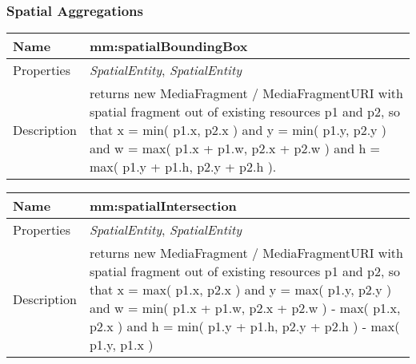 \subsubsection*{Spatial Aggregations}
\begin{tabular}{|p{3cm}|p{10cm}|}
\hline Name & mm:spatialBoundingBox\\
\hline Properties & \textit{SpatialEntity}, \textit{SpatialEntity} \\
\hline Description & returns new MediaFragment / MediaFragmentURI with spatial fragment out of existing resources p1 and p2, so that x = min( p1.x, p2.x ) and y = min( p1.y, p2.y ) and w = max( p1.x + p1.w, p2.x + p2.w ) and h = max( p1.y + p1.h, p2.y + p2.h ).\\
\hline
\end{tabular}
\vspace{0.3cm}
\newline
\begin{tabular}{|p{3cm}|p{10cm}|}
\hline Name & mm:spatialIntersection\\
\hline Properties & \textit{SpatialEntity}, \textit{SpatialEntity} \\
\hline Description & returns new MediaFragment / MediaFragmentURI with spatial fragment out of existing resources p1 and p2, so that x = max( p1.x, p2.x ) and y = max( p1.y, p2.y ) and w = min( p1.x + p1.w, p2.x + p2.w ) - max( p1.x, p2.x ) and h = min( p1.y + p1.h, p2.y + p2.h ) - max( p1.y, p1.x )\\
\hline
\end{tabular}
\vspace{0.3cm}
\newline
